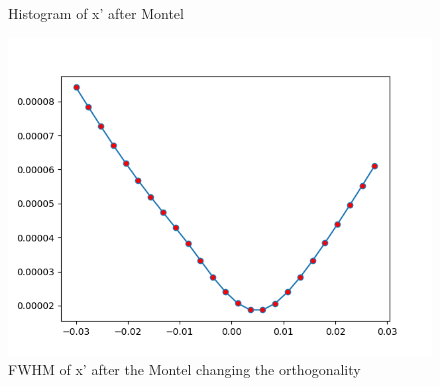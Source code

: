 \begin{figure}[]
%
\centering
%
\quad
%
%
\caption{Histogram of x' after Montel}
%
\label{fig: incidence angle}
%
\end{figure}
\begin{figure}
%
\centering
%
\includegraphics[width=.6\textwidth]{Immagini/Chapter4/FWHMChangingOrt}
%
\caption{FWHM of x' after the Montel changing the orthogonality}
%
\label{fig:FWHM changing orthogonality}
%
\end{figure}
